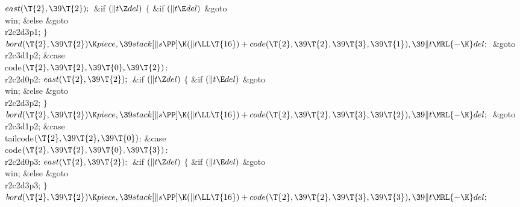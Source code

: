 ${}\\{east}(\T{2},\39\T{2});{}$\6
\&{if} ${}(\|t\Z\\{del}){}$\5
${}\{{}$\5
\1\&{if} ${}(\|t\E\\{del}){}$\1\5
\&{goto} \\{win};\5
\2\&{else}\1\5
\&{goto} \\{r2c2d3p1};\5
\2${}\}{}$\2\6
${}\\{bord}(\T{2},\39\T{2})\K\\{piece},\39\\{stack}[\|s\PP]\K(\|t\LL\T{16})+%
\\{code}(\T{2},\39\T{2},\39\T{3},\39\T{1}),\39\|t\MRL{-{\K}}\\{del};{}$\6
\&{goto} \\{r2c3d1p2};\6
\4\&{case} \\{code}${}(\T{2},\39\T{2},\39\T{0},\39\T{2}){}$:\5
\\{r2c2d0p2}:\5
${}\\{east}(\T{2},\39\T{2});{}$\6
\&{if} ${}(\|t\Z\\{del}){}$\5
${}\{{}$\5
\1\&{if} ${}(\|t\E\\{del}){}$\1\5
\&{goto} \\{win};\5
\2\&{else}\1\5
\&{goto} \\{r2c2d3p2};\5
\2${}\}{}$\2\6
${}\\{bord}(\T{2},\39\T{2})\K\\{piece},\39\\{stack}[\|s\PP]\K(\|t\LL\T{16})+%
\\{code}(\T{2},\39\T{2},\39\T{3},\39\T{2}),\39\|t\MRL{-{\K}}\\{del};{}$\6
\&{goto} \\{r2c3d1p2};\6
\4\&{case} \\{tailcode}${}(\T{2},\39\T{2},\39\T{0}){}$:\5
\&{case} \\{code}${}(\T{2},\39\T{2},\39\T{0},\39\T{3}){}$:\5
\\{r2c2d0p3}:\5
${}\\{east}(\T{2},\39\T{2});{}$\6
\&{if} ${}(\|t\Z\\{del}){}$\5
${}\{{}$\5
\1\&{if} ${}(\|t\E\\{del}){}$\1\5
\&{goto} \\{win};\5
\2\&{else}\1\5
\&{goto} \\{r2c2d3p3};\5
\2${}\}{}$\2\6
${}\\{bord}(\T{2},\39\T{2})\K\\{piece},\39\\{stack}[\|s\PP]\K(\|t\LL\T{16})+%
\\{code}(\T{2},\39\T{2},\39\T{3},\39\T{3}),\39\|t\MRL{-{\K}}\\{del};{}$\6
